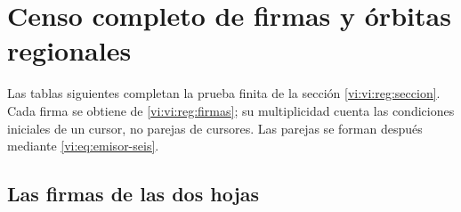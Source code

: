 \section{Censo completo de firmas y órbitas regionales}
\label{vi:vi:reg:tablas}

Las tablas siguientes completan la prueba finita de la sección
\ref{vi:vi:reg:seccion}. Cada firma se obtiene de
\eqref{vi:vi:reg:firmas}; su multiplicidad cuenta las condiciones
iniciales de un cursor, no parejas de cursores. Las parejas se
forman después mediante \eqref{vi:eq:emisor-seis}.

\subsection{Las firmas de las dos hojas}

